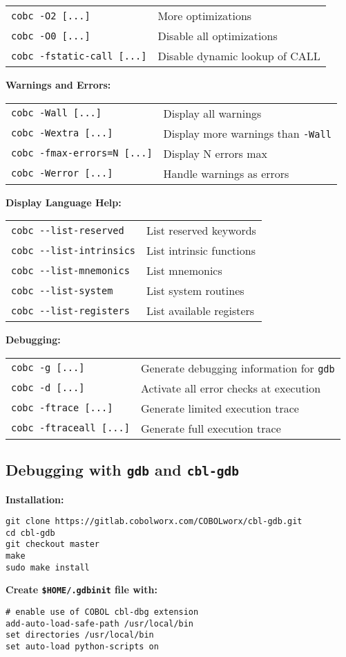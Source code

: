 \documentclass[10pt,landscape]{article}
\begin{document}
\begin{multicols}{3}
{\begin{tabular}{ll}
\verb+cobc -O2 [...]+ & More optimizations\\
\verb+cobc -O0 [...]+ & Disable all optimizations\\
\verb+cobc -fstatic-call [...]+ & Disable dynamic lookup of CALL\\
\end{tabular}
{\bf Warnings and Errors:}\\
\begin{tabular}{ll}
\verb+cobc -Wall [...]+ & Display all warnings\\
\verb+cobc -Wextra [...]+ & Display more warnings than \verb+-Wall+\\
\verb+cobc -fmax-errors=N [...]+ & Display N errors max\\
\verb+cobc -Werror [...]+ & Handle warnings as errors\\
\end{tabular}
{\bf Display Language Help:}\\
\begin{tabular}{ll}
\verb+cobc --list-reserved+ & List reserved keywords\\
\verb+cobc --list-intrinsics+ & List intrinsic functions\\
\verb+cobc --list-mnemonics+ & List mnemonics\\
\verb+cobc --list-system+ & List system routines\\
\verb+cobc --list-registers+ & List available registers\\
\end{tabular}
{\bf Debugging:}\\
\begin{tabular}{ll}
\verb+cobc -g [...]+ & Generate debugging information for \verb+gdb+\\
\verb+cobc -d [...]+ & Activate all error checks at execution\\
\verb+cobc -ftrace [...]+ & Generate limited execution trace\\
\verb+cobc -ftraceall [...]+ & Generate full execution trace\\
\end{tabular}
}

    \subsection{Debugging with {\tt gdb} and {\tt cbl-gdb}}

{\bf Installation:}\vspace{-3mm}
\begin{verbatim}
git clone https://gitlab.cobolworx.com/COBOLworx/cbl-gdb.git
cd cbl-gdb
git checkout master
make
sudo make install
\end{verbatim}\vspace{-2mm}
{\bf Create \verb+$HOME/.gdbinit+ file with:}\vspace{-3mm}
\begin{verbatim}
# enable use of COBOL cbl-dbg extension
add-auto-load-safe-path /usr/local/bin
set directories /usr/local/bin
set auto-load python-scripts on
\end{verbatim}\vspace{-2mm}


\end{multicols}
\end{document}
